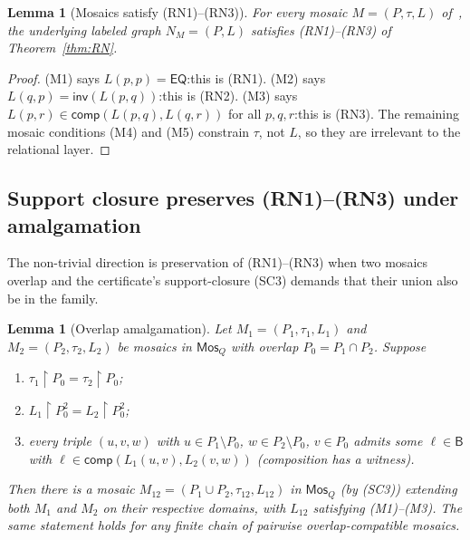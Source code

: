 \documentclass[11pt]{article}
\newtheorem{lemma}[theorem]{Lemma}
\newcommand{\EQ}{\mathsf{EQ}}
\newcommand{\Base}{\mathsf{B}}
\newcommand{\Inv}{\mathsf{inv}}
\newcommand{\comp}{\mathsf{comp}}
\newcommand{\Mos}{\mathsf{Mos}}
\begin{document}
\begin{lemma}[Mosaics satisfy (RN1)--(RN3)]\label{lem:M-to-RN}
For every mosaic \(M = (P,\tau,L)\) of~\cite[Def.~4.3]{repaired},
the underlying labeled graph \(N_M = (P, L)\) satisfies
\textnormal{(RN1)--(RN3)} of Theorem~\ref{thm:RN}.
\end{lemma}

\begin{proof}
(M1) says \(L(p,p) = \EQ\):\@ this is (RN1).  (M2) says
\(L(q,p) = \Inv(L(p,q))\):\@ this is (RN2).  (M3) says
\(L(p,r) \in \comp(L(p,q), L(q,r))\) for all \(p,q,r\):\@ this is
(RN3).  The remaining mosaic conditions (M4) and (M5) constrain
\(\tau\), not \(L\), so they are irrelevant to the relational layer.
\end{proof}

\subsection{Support closure preserves (RN1)--(RN3) under amalgamation}

The non-trivial direction is preservation of (RN1)--(RN3) when two
mosaics overlap and the certificate's support-closure (SC3) demands
that their union also be in the family.

\begin{lemma}[Overlap amalgamation]\label{lem:overlap}
Let \(M_1 = (P_1, \tau_1, L_1)\) and \(M_2 = (P_2, \tau_2, L_2)\) be
mosaics in \(\Mos_Q\) with overlap \(P_0 = P_1 \cap P_2\).  Suppose
\begin{enumerate}[label=\textnormal{(O\arabic*)}, leftmargin=3em]
  \item \(\tau_1 \restriction P_0 = \tau_2 \restriction P_0\);
  \item \(L_1 \restriction P_0^2 = L_2 \restriction P_0^2\);
  \item every triple \((u,v,w)\) with \(u \in P_1 \setminus P_0\),
    \(w \in P_2 \setminus P_0\), \(v \in P_0\) admits some
    \(\ell \in \Base\) with
    \(\ell \in \comp(L_1(u,v), L_2(v,w))\) (composition has a witness).
\end{enumerate}
Then there is a mosaic \(M_{12} = (P_1 \cup P_2, \tau_{12}, L_{12})\)
in \(\Mos_Q\) (by (SC3)) extending both \(M_1\) and \(M_2\) on their
respective domains, with \(L_{12}\) satisfying \textnormal{(M1)--(M3)}.
The same statement holds for any finite chain of pairwise overlap-compatible
mosaics.
\end{lemma}
\end{document}
